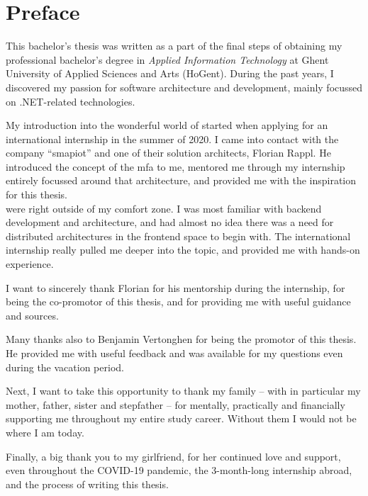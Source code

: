 
\chapter*{Preface}
\label{ch:preface}

This bachelor's thesis was written as a part of the final steps of obtaining my
professional bachelor's degree in \textit{Applied Information Technology} at
Ghent University of Applied Sciences and Arts
(HoGent). During the past years, I discovered
my passion for software architecture and development, mainly focussed on
.NET-related technologies.

My introduction into the wonderful world of  started
when applying for an international internship in the summer of 2020. I came into
contact with the company ``smapiot'' and one of their solution architects,
Florian Rappl. He introduced the concept of the \gls{mfa} to me, mentored me
through my internship entirely focussed around that architecture, and provided
me with the inspiration for this thesis.\\
 were right outside of my comfort zone. I was most
familiar with \gls{backend} development and architecture, and had almost no idea
there was a need for distributed architectures in the \gls{frontend} space to
begin with. The international internship really pulled me deeper into the topic,
and provided me with hands-on experience.

I want to sincerely thank Florian for his mentorship during the internship, for
being the co-promotor of this thesis, and for providing me with useful guidance
and sources. 

Many thanks also to Benjamin Vertonghen for being the promotor of
this thesis. He provided me with useful feedback and was available for my
questions even during the vacation period.

Next, I want to take this opportunity to thank my family -- with in particular
my mother, father, sister and stepfather -- for mentally, practically and
financially supporting me throughout my entire study career. Without them I
would not be where I am today.

Finally, a big thank you to my girlfriend, for her continued love and support,
even throughout the COVID-19 pandemic, the 3-month-long internship abroad, and
the process of writing this thesis.